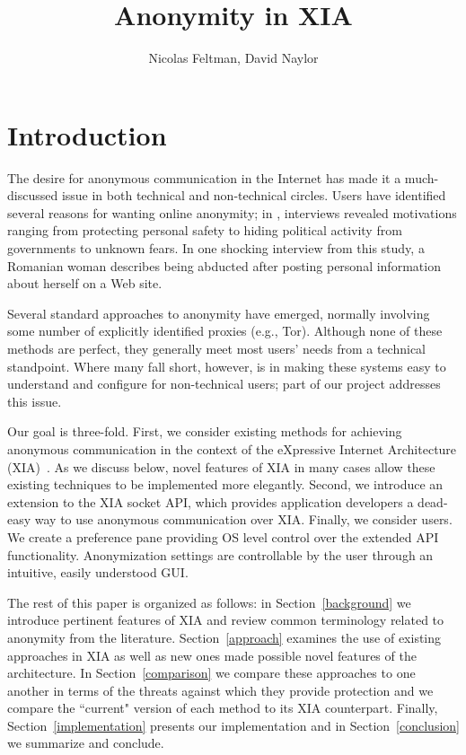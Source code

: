 \documentclass{article}
\title{Anonymity in XIA}
\author{Nicolas Feltman, David Naylor}
\begin{document}
\maketitle

\section{Introduction}
\label{introduction}
The desire for anonymous communication in the Internet has made it a much-discussed issue in both technical and non-technical circles. Users have identified several reasons for wanting online anonymity; in \cite{ruogu}, interviews revealed motivations ranging from protecting personal safety to hiding political activity from governments to unknown fears. In one shocking interview from this study, a Romanian woman describes being abducted after posting personal information about herself on a Web site.

Several standard approaches to anonymity have emerged, normally involving some number of explicitly identified proxies (e.g., Tor). Although none of these methods are perfect, they generally meet most users' needs from a technical standpoint. Where many fall short, however, is in making these systems easy to understand and configure for non-technical users; part of our project addresses this issue.

Our goal is three-fold. First, we consider existing methods for achieving anonymous communication in the context of the eXpressive Internet Architecture (XIA)~\cite{xia}. As we discuss below, novel features of XIA in many cases allow these existing techniques to be implemented more elegantly. Second, we introduce an extension to the XIA socket API, which provides application developers a dead-easy way to use anonymous communication over XIA. Finally, we consider  users. We create a preference pane providing OS level control over the extended API functionality. Anonymization settings are controllable by the user through an intuitive, easily understood GUI.

The rest of this paper is organized as follows: in Section~\ref{background} we introduce pertinent features of XIA and review common terminology related to anonymity from the literature. Section~\ref{approach} examines the use of existing approaches in XIA as well as new ones made possible novel features of the architecture. In Section~\ref{comparison} we compare these approaches to one another in terms of the threats against which they provide protection and we compare the ``current" version of each method to its XIA counterpart. Finally, Section~\ref{implementation} presents our implementation and in Section~\ref{conclusion} we summarize and conclude.
\end{document}
